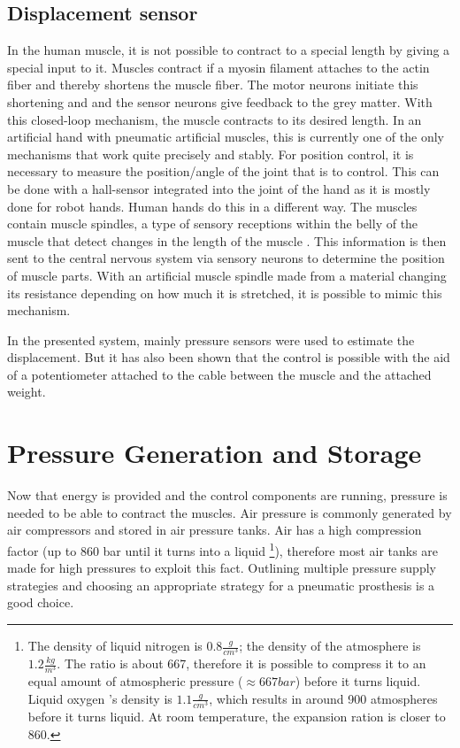 \documentclass[main]{subfiles}
\begin{document}
\subsection{Displacement sensor}
In the human muscle, it is not possible to contract to a special length by giving a special input to it. Muscles contract if a myosin filament attaches to the actin fiber and thereby shortens the muscle fiber. The motor neurons initiate this shortening and and the sensor neurons give feedback to the grey matter. With this closed-loop mechanism, the muscle contracts to its desired length. In an artificial hand with pneumatic artificial muscles, this is currently one of the only mechanisms that work quite precisely and stably. For position control, it is necessary to measure the position/angle of the joint that is to control. This can be done with a hall-sensor integrated into the joint of the hand as it is mostly done for robot hands. Human hands do this in a different way. The muscles contain muscle spindles, a type of sensory receptions within the belly of the muscle that detect changes in the length of the muscle \cite{Hulliger1984}. This information is then sent to the central nervous system via sensory neurons to determine the position of muscle parts. With an artificial muscle spindle made from a material changing its resistance depending on how much it is stretched, it is possible to mimic this mechanism. 

In the presented system, mainly pressure sensors were used to estimate the displacement. But it has also been shown that the control is possible with the aid of a potentiometer attached to the cable between the muscle and the attached weight.

\section{Pressure Generation and Storage}

Now that energy is provided and the control components are running, pressure is needed to be able to contract the muscles. Air pressure is commonly generated by air compressors and stored in air pressure tanks. Air has a high compression factor (up to 860 bar until it turns into a liquid \footnote{The density of liquid nitrogen is $0.8 \frac{g}{cm^3}$; the density of the atmosphere is $1.2 \frac{kg}{m^3}$.  The ratio is about 667, therefore it is possible to compress it to an equal amount of atmospheric pressure ($\approx 667 bar$) before it turns liquid. Liquid oxygen 's density is $1.1 \frac{g}{cm^3}$, which results in around 900 atmospheres before it turns liquid. At room temperature, the expansion ration is closer to 860.}), therefore most air tanks are made for high pressures to exploit this fact. Outlining multiple pressure supply strategies and choosing an appropriate strategy for a pneumatic prosthesis is a good choice.
\end{document}
